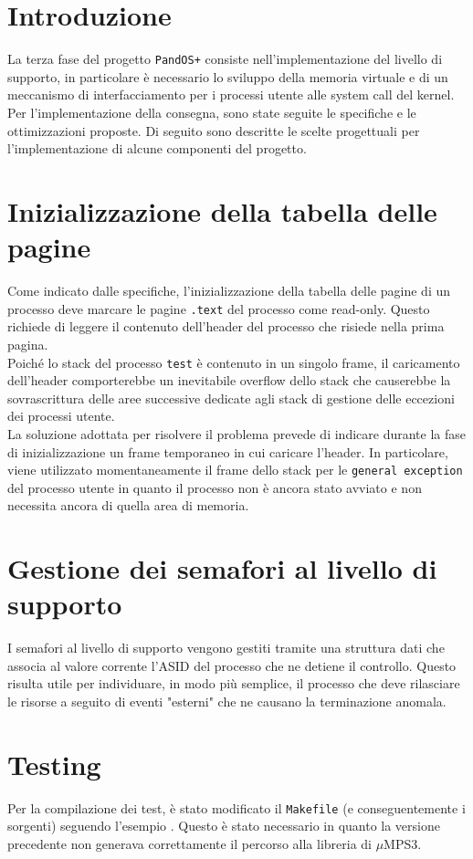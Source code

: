 \documentclass[11pt]{article}
\begin{document}
\newpage

\section{Introduzione}
La terza fase del progetto \texttt{PandOS+} consiste nell'implementazione del livello di supporto, 
in particolare è necessario lo sviluppo della memoria virtuale e di un meccanismo di interfacciamento per i processi utente alle system call del kernel.\\
Per l'implementazione della consegna, sono state seguite le specifiche e le ottimizzazioni proposte. 
Di seguito sono descritte le scelte progettuali per l'implementazione di alcune componenti del progetto.

\section{Inizializzazione della tabella delle pagine}
Come indicato dalle specifiche, l'inizializzazione della tabella delle pagine di un processo deve marcare le pagine \texttt{.text} del processo come read-only.
Questo richiede di leggere il contenuto dell'header del processo che risiede nella prima pagina. \\
Poiché lo stack del processo \texttt{test} è contenuto in un singolo frame, il caricamento dell'header comporterebbe un inevitabile overflow dello stack che 
causerebbe la sovrascrittura delle aree successive dedicate agli stack di gestione delle eccezioni dei processi utente. \\
La soluzione adottata per risolvere il problema prevede di indicare durante la fase di inizializzazione un frame temporaneo in cui caricare l'header.
In particolare, viene utilizzato momentaneamente il frame dello stack per le \texttt{general exception} del processo utente in quanto il processo non è ancora stato avviato e non necessita ancora di quella area di memoria.

\section{Gestione dei semafori al livello di supporto}
I semafori al livello di supporto vengono gestiti tramite una struttura dati che associa al valore corrente l'ASID del processo che ne detiene il controllo.
Questo risulta utile per individuare, in modo più semplice, il processo che deve rilasciare le risorse a seguito di eventi "esterni" che ne causano la terminazione anomala.

\section{Testing}
Per la compilazione dei test, è stato modificato il \texttt{Makefile} (e conseguentemente i sorgenti) seguendo l'esempio \cite{1}. 
Questo è stato necessario in quanto la versione precedente non generava correttamente il percorso alla libreria di $\mu$MPS3.

\newpage
\printbibliography[title={Bibliografia}]
\end{document}
